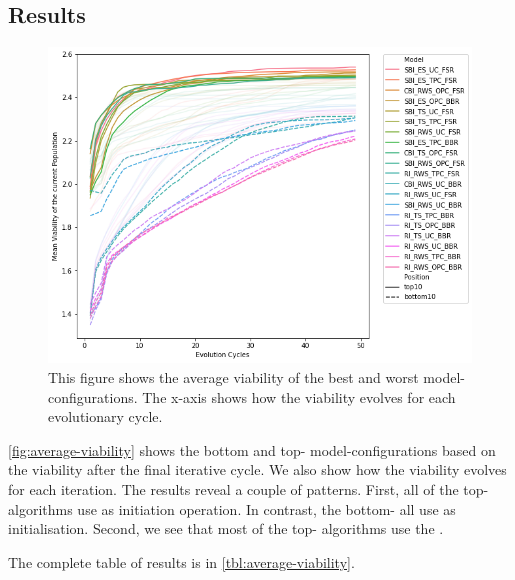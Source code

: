 \documentclass[./../../paper.tex]{subfiles}
\begin{document}
\subsection{Results}

\begin{figure}[htbp]
    \centering
    \includegraphics[width=\textwidth]{figures/generated/exp1_effect_on_viability_top10_last10.png}
    \caption{This figure shows the average viability of the  best and worst model-configurations. The x-axis shows how the viability evolves for each evolutionary cycle.}
    \label{fig:average-viability}
\end{figure}

\noindent \autoref{fig:average-viability} shows the bottom and top- model-configurations based on the viability after the final iterative cycle. We also show how the viability evolves for each iteration. The results reveal a couple of patterns. 
First, all of the top- algorithms use  as initiation operation. In contrast, the bottom- all use  as initialisation. 
Second, we see that most of the top- algorithms use the . 

The complete table of results is in \autoref{tbl:average-viability}.

\end{document}
